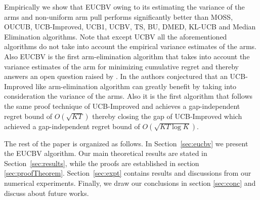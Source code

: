 Empirically we show that EUCBV owing to its estimating the variance of the arms and non-uniform arm pull  performs significantly better than MOSS, OUCUB, UCB-Improved, UCB1, UCBV, TS, BU, DMED, KL-UCB and Median Elimination algorithms. Note that except UCBV all the aforementioned algorithms do not take into account the empirical variance estimates of the arms. Also EUCBV is the first arm-elimination algorithm that takes into account the variance estimates of the arm for minimizing cumulative regret and thereby answers an open question raised by \citet{auer2010ucb}. In \citet{auer2010ucb} the authors conjectured that an UCB-Improved like arm-elimination algorithm can greatly benefit by taking into consideration the variance of the arms. Also it is the first algorithm that follows the same proof technique of UCB-Improved and achieves a gap-independent regret bound of $O\left( \sqrt{KT} \right)$ thereby closing the gap of UCB-Improved which achieved a gap-independent regret bound of $O\left( \sqrt{KT\log K} \right)$. 
	
	The rest of the paper is organized as follows. In Section~\ref{sec:eucbv} we present the  EUCBV algorithm. Our main theoretical results are stated in Section~\ref{sec:results}, while the proofs are established in   section \ref{sec:proofTheorem}. Section~\ref{sec:expt} contains results and discussions from our numerical experiments. Finally, we draw our conclusions in section \ref{sec:conc} and discuss about future works.
	
	
	